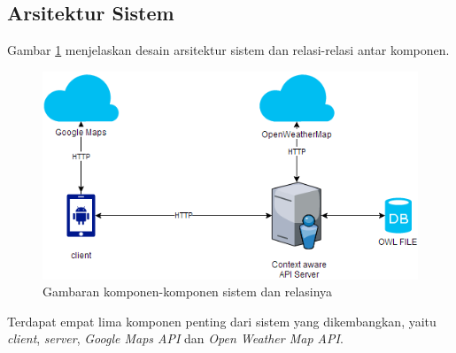  
\subsection{Arsitektur Sistem}
\par
Gambar \ref{fig:arch-sys} menjelaskan desain arsitektur sistem dan relasi-relasi antar komponen.
\newline
\begin{figure}[h!]
    \centering
    \includegraphics[scale=0.5]{img/arsitektur_sistem.png}
    \caption{Gambaran komponen-komponen sistem dan relasinya}
    \label{fig:arch-sys}
\end{figure}

\par
Terdapat empat lima  komponen penting dari sistem yang dikembangkan, yaitu \textit{client}, \textit{server}, 
\textit{Google Maps API} dan \textit{Open Weather Map API}.

